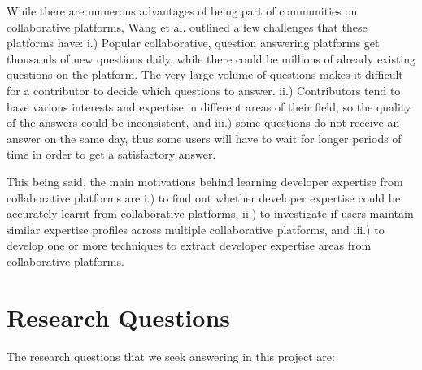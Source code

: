             While there are numerous advantages of being part of communities on collaborative platforms, Wang et al. \cite{wang2018survey} outlined a few challenges that these platforms have: i.) Popular collaborative, question answering platforms get thousands of new questions daily, while there could be millions of already existing questions on the platform. The very large volume of questions makes it difficult for a contributor to decide which questions to answer. ii.) Contributors tend to have various interests and expertise in different areas of their field, so the quality of the answers could be inconsistent, and iii.) some questions do not receive an answer on the same day, thus some users will have to wait for longer periods of time in order to get a satisfactory answer. 
            
            This being said, the main motivations behind learning developer expertise from collaborative platforms are i.) to find out whether developer expertise could be accurately learnt from collaborative platforms, ii.) to investigate if users maintain similar expertise profiles across multiple collaborative platforms, and iii.) to develop one or more techniques to extract developer expertise areas from collaborative platforms.
    
    \section{Research Questions\label{sec:RQs}}
        The research questions that we seek answering in this project are:
    
